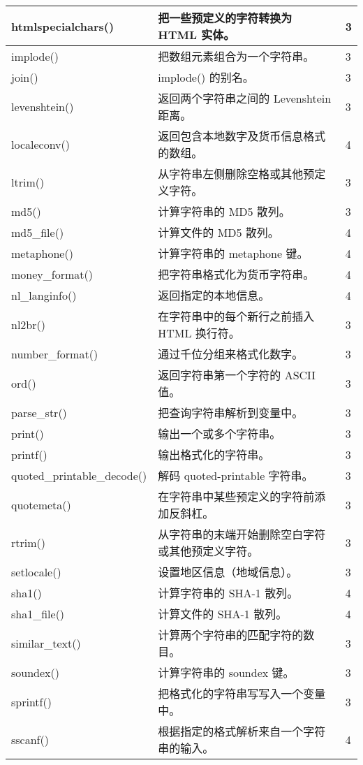 \begin{longtable}{|m{120pt}|m{250pt}|m{20pt}|}
\hline
htmlspecialchars()			&把一些预定义的字符转换为 HTML 实体。&	3\\
\hline
implode()					&把数组元素组合为一个字符串。	&3\\
\hline
join()						&implode() 的别名。	&3\\
\hline
levenshtein()				&返回两个字符串之间的 Levenshtein 距离。&	3\\
\hline
localeconv()					&返回包含本地数字及货币信息格式的数组。&	4\\
\hline
ltrim()						&从字符串左侧删除空格或其他预定义字符。&	3\\
\hline
md5()						&计算字符串的 MD5 散列。	&3\\
\hline
md5\_file()					&计算文件的 MD5 散列。	&4\\
\hline
metaphone()				&计算字符串的 metaphone 键。&	4\\
\hline
money\_format()				&把字符串格式化为货币字符串。&	4\\
\hline
nl\_langinfo()				&返回指定的本地信息。	&4\\
\hline
nl2br()						&在字符串中的每个新行之前插入 HTML 换行符。	&3\\
\hline
number\_format()			&通过千位分组来格式化数字。	&3\\
\hline
ord()						&返回字符串第一个字符的 ASCII 值。&	3\\
\hline
parse\_str()					&把查询字符串解析到变量中。	&3\\
\hline
print()						&输出一个或多个字符串。	&3\\
\hline
printf()						&输出格式化的字符串。	&3\\
\hline
quoted\_printable\_decode()	&解码 quoted-printable 字符串。&	3\\
\hline
quotemeta()				&在字符串中某些预定义的字符前添加反斜杠。	&3\\
\hline
rtrim()						&从字符串的末端开始删除空白字符或其他预定义字符。	&3\\
\hline
setlocale()					&设置地区信息（地域信息）。	&3\\
\hline
sha1()						&计算字符串的 SHA-1 散列。	&4\\
\hline
sha1\_file()					&计算文件的 SHA-1 散列。	&4\\
\hline
similar\_text()				&计算两个字符串的匹配字符的数目。	&3\\
\hline
soundex()					&计算字符串的 soundex 键。	&3\\
\hline
sprintf()					&把格式化的字符串写写入一个变量中。	&3\\
\hline
sscanf()						&根据指定的格式解析来自一个字符串的输入。	&4\\

\end{longtable}
